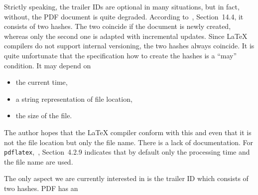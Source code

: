 \documentclass[a4paper, USenglish]{article}%
\begin{document}
Strictly speaking, the trailer IDs are optional in many situations, but in fact, without, the PDF document is quite degraded. 
According to~\cite{Pdf20}, Section~14.4, it consists of two hashes. 
The two coincide if the document is newly created, 
whereas only the second one is adapted with incremental updates. 
Since \LaTeX{} compilers do not support internal versioning, the two hashes always coincide. 
It is quite unfortunate that the specification how to create the hashes is a ``may'' condition. 
It may depend on 
%
\begin{itemize}
\item the current time, 
\item a string representation of file location, 
\item the size of the file. 
\end{itemize}

The author hopes that the \LaTeX{} compiler conform with this and even that it is not the file location 
but only the file name. 
There is a lack of documentation. 
For \texttt{pdflatex},~\cite{PdfTexUsr25}, 
Section~4.2.9 indicates that by default only the processing time and the file name are used. 



The only aspect we are currently interested in is the trailer ID which consists of two hashes. 
PDF has an 


{}%

\end{document}

